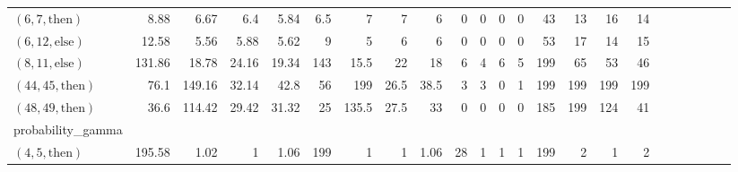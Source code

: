 \documentclass[sigconf]{acmart}
\newcommand{\thenBr}{\text{then}}
\newcommand{\elseBr}{\text{else}}
\begin{document}
\begin{table*}
{\begin{tabular}{l|rrrr|rrrr|rrrr|rrrr|r|r|r|r|r|r}
    $(6,7,\thenBr)$    & 8.88        & 6.67       & 6.4           & 5.84           & 6.5   & 7     & 7       & 6       & 0         & 0        & 0         & 0           & 43       & 13       & 16        & 14 & & & & & & \\
    $(6,12,\elseBr)$   & 12.58       & 5.56       & 5.88          & 5.62           & 9     & 5     & 6       & 6       & 0         & 0        & 0         & 0           & 53       & 17       & 14        & 15 & & & & & & \\
    $(8,11,\elseBr)$   & 131.86      & 18.78      & 24.16         & 19.34          & 143   & 15.5  & 22      & 18      & 6         & 4        & 6         & 5           & 199      & 65       & 53        & 46 & & & & & &\\
    $(44,45,\thenBr)$  & 76.1        & 149.16     & 32.14         & 42.8           & 56    & 199   & 26.5    & 38.5    & 3         & 3        & 0         & 1           & 199      & 199      & 199       & 199 & & & & & & \\
    $(48,49,\thenBr)$  & 36.6        & 114.42     & 29.42         & 31.32          & 25    & 135.5 & 27.5    & 33      & 0         & 0        & 0         & 0           & 185      & 199      & 124       & 41 & & & & & & \\
    \midrule
    \midrule
    probability\_gamma &             &            &               &                &       &       &         &         &           &          &           &             &          &          &           &  & & & & & & \\
    $(4,5,\thenBr)$    & 195.58      & 1.02       & 1             & 1.06           & 199   & 1     & 1       & 1.06    & 28        & 1        & 1         & 1           & 199      & 2        & 1         & 2 & & & & & & \\

\end{tabular}}
\end{table*}
\end{document}
